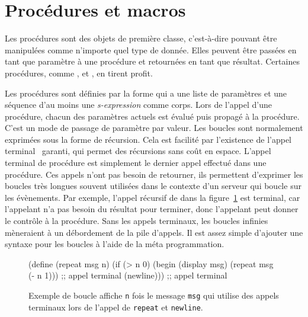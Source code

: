 \section{Procédures et macros}
\label{sec:proc_and_macro}

Les procédures sont des objets de première classe, c'est-à-dire pouvant
être manipulées comme n'importe quel type de donnée. Elles peuvent
être passées en tant que paramètre à une procédure et retournées en tant que
résultat.  Certaines procédures, comme ,  et
, en tirent profit.

Les procédures sont définies par la forme  qui a une liste de
paramètres et une séquence d'au moins une \textit{s-expression} comme corps.
Lors de l'appel d'une procédure, chacun des paramètres actuels est évalué puis
propagé à la procédure. C'est un mode de passage de paramètre par valeur. Les
boucles sont normalement exprimées sous la forme de récursion.  Cela est
facilité par l'existence de l'appel terminal~\cite{DBLP:conf/acm/Steele77}
garanti, qui permet des récursions sans coût en espace. L'appel terminal de
procédure est simplement le dernier appel effectué dans une procédure. Ces
appels n'ont pas besoin de retourner, ils permettent d'exprimer les boucles
très longues souvent utilisées dans le contexte d'un serveur qui boucle sur les
évènements.  Par exemple, l'appel récursif de  dans la
figure~\ref{fig:appel_terminal_example} est terminal, car l'appelant n'a pas
besoin du résultat pour terminer, donc l'appelant peut donner le contrôle à la
procédure. Sans les appels terminaux, les boucles infinies mèneraient à un
débordement de la pile d'appels. Il est assez simple d'ajouter une syntaxe pour
les boucles à l'aide de la méta programmation.

\begin{figure}[ht]
  \begin{mplisting}{0.9}
(define (repeat msg n)
  (if (> n 0)
      (begin
        (display msg)
        (repeat msg (- n 1))) ;; appel terminal
      (newline))) ;; appel terminal
\end{mplisting}
  \caption{Exemple de boucle affiche {\tt n} fois le message {\tt msg} qui
    utilise des appels terminaux lors de l'appel de {\tt repeat} et
    {\tt newline}.}
  \label{fig:appel_terminal_example}
\end{figure}


